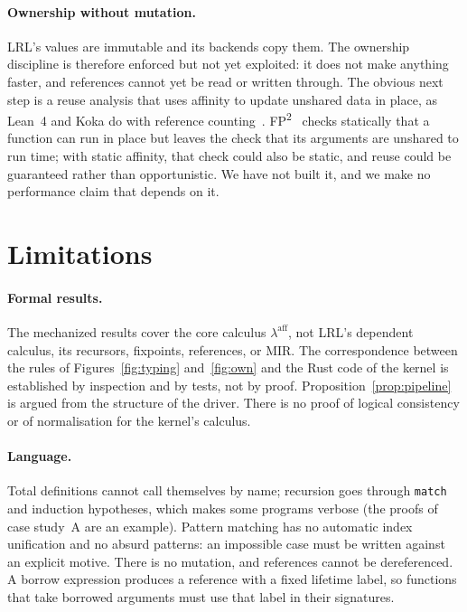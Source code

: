 \paragraph{Ownership without mutation.}
LRL's values are immutable and its backends copy them.
The ownership discipline is therefore enforced but not yet exploited: it does not make anything faster, and references cannot yet be read or written through.
The obvious next step is a reuse analysis that uses affinity to update unshared data in place, as Lean~4 and Koka do with reference counting~\cite{ullrich2019beans,reinking2021perceus}. FP\textsuperscript{2}~\cite{lorenzen2023fp2} checks statically that a function can run in place but leaves the check that its arguments are unshared to run time; with static affinity, that check could also be static, and reuse could be guaranteed rather than opportunistic.
We have not built it, and we make no performance claim that depends on it.

\section{Limitations}\label{sec:limits}

\paragraph{Formal results.}
The mechanized results cover the core calculus $\lambda^{\mathrm{aff}}$, not LRL's dependent calculus, its recursors, fixpoints, references, or MIR.
The correspondence between the rules of Figures~\ref{fig:typing} and~\ref{fig:own} and the Rust code of the kernel is established by inspection and by tests, not by proof.
Proposition~\ref{prop:pipeline} is argued from the structure of the driver.
There is no proof of logical consistency or of normalisation for the kernel's calculus.

\paragraph{Language.}
Total definitions cannot call themselves by name; recursion goes through \lstinline|match| and induction hypotheses, which makes some programs verbose (the proofs of case study~A are an example).
Pattern matching has no automatic index unification and no absurd patterns: an impossible case must be written against an explicit motive.
There is no mutation, and references cannot be dereferenced.
A borrow expression produces a reference with a fixed lifetime label, so functions that take borrowed arguments must use that label in their signatures.

